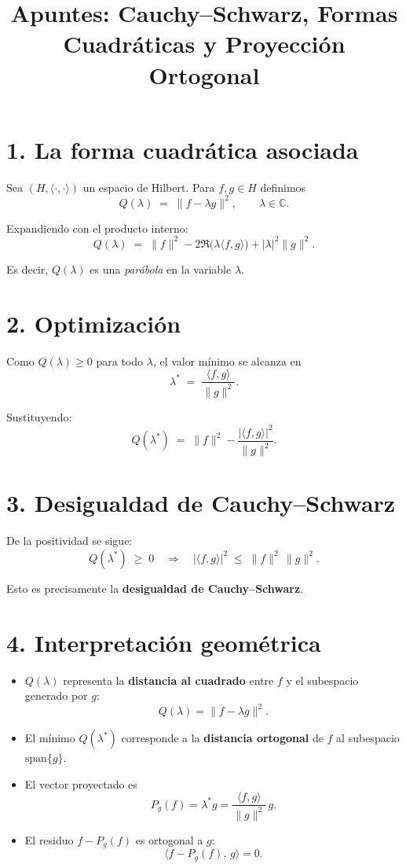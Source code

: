 \documentclass[12pt]{article}
\title{Apuntes: Cauchy--Schwarz, Formas Cuadráticas y Proyección Ortogonal}
\author{}
\date{}
\begin{document}
\maketitle

\section*{1. La forma cuadrática asociada}
Sea $(H,\langle \cdot,\cdot\rangle)$ un espacio de Hilbert. 
Para $f,g \in H$ definimos
\[
Q(\lambda) \;=\; \|f - \lambda g\|^2, \qquad \lambda \in \mathbb{C}.
\]

\noindent
Expandiendo con el producto interno:
\[
Q(\lambda) \;=\; \|f\|^2 - 2\Re\!\big(\lambda \langle f,g\rangle\big) + |\lambda|^2 \|g\|^2.
\]

Es decir, $Q(\lambda)$ es una \emph{parábola} en la variable $\lambda$.

\section*{2. Optimización}
Como $Q(\lambda) \geq 0$ para todo $\lambda$, el valor mínimo se alcanza en
\[
\lambda^* \;=\; \frac{\langle f,g\rangle}{\|g\|^2}.
\]

\noindent
Sustituyendo:
\[
Q(\lambda^*) \;=\; \|f\|^2 - \frac{|\langle f,g\rangle|^2}{\|g\|^2}.
\]

\section*{3. Desigualdad de Cauchy--Schwarz}
De la positividad se sigue:
\[
Q(\lambda^*) \;\geq\; 0 
\quad \Longrightarrow \quad
|\langle f,g\rangle|^2 \;\leq\; \|f\|^2 \, \|g\|^2.
\]

\noindent
Esto es precisamente la \textbf{desigualdad de Cauchy--Schwarz}.

\section*{4. Interpretación geométrica}
\begin{itemize}
  \item $Q(\lambda)$ representa la \textbf{distancia al cuadrado} entre $f$ y el subespacio generado por $g$:
  \[
  Q(\lambda) = \|f - \lambda g\|^2.
  \]
  \item El mínimo $Q(\lambda^*)$ corresponde a la \textbf{distancia ortogonal} de $f$ al subespacio $\text{span}\{g\}$.
  \item El vector proyectado es
  \[
  P_g(f) = \lambda^* g = \frac{\langle f,g\rangle}{\|g\|^2}\, g.
  \]
  \item El residuo $f - P_g(f)$ es ortogonal a $g$:
  \[
  \langle f - P_g(f), \, g \rangle = 0.
  \]
\end{itemize}
\end{document}
